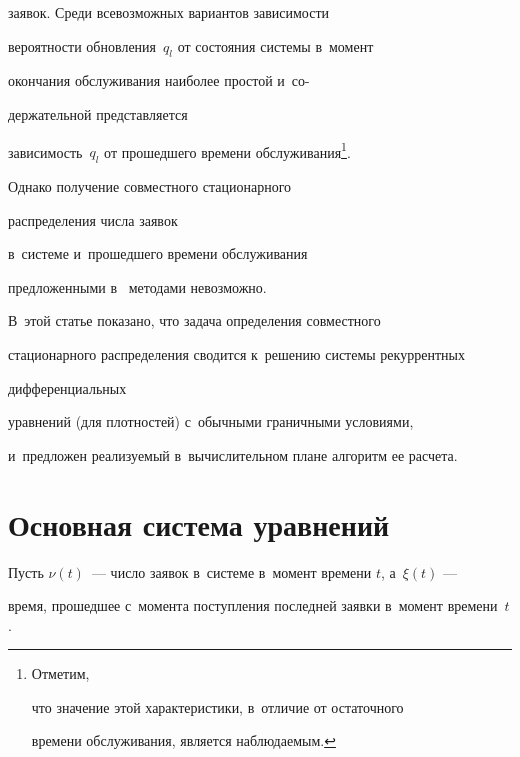 заявок. Среди всевозможных вариантов за\-ви\-си\-мости

ве\-ро\-ят\-ности об\-нов\-ле\-ния~$q_l$ от состояния сис\-те\-мы в~момент

окончания обслуживания наиболее прос\-той и~со-\linebreak\vspace*{-12pt}



\pagebreak



\noindent

держательной пред\-став\-ля\-ет\-ся 

за\-ви\-си\-мость~$q_l$ от прошедшего времени обслуживания\footnote{Отметим,

что значение этой характеристики, в~отличие от остаточного

времени обслуживания, является наблюдаемым.}.

Однако получение совместного стационарного

распределения чис\-ла заявок

в~сис\-те\-ме и~прошедшего времени обслуживания

предложенными в~\cite{11} методами невозможно.

В~этой статье показано, что задача определения совместного

стационарного распределения сводится к~решению сис\-те\-мы рекуррентных 

дифференциальных

уравнений (для плотностей) с~обычными граничными условиями,

и~предложен реа\-ли\-зу\-емый в~вычислительном плане алгоритм ее расчета.



\vspace*{-2pt}



\section{Основная система уравнений}



\vspace*{-2pt}





Пусть $\nu(t)$~--- число заявок в~системе в~момент времени $t$, а~$\xi(t)$ ---

время, прошедшее с~момента поступления последней заявки в~момент времени~$t$.

